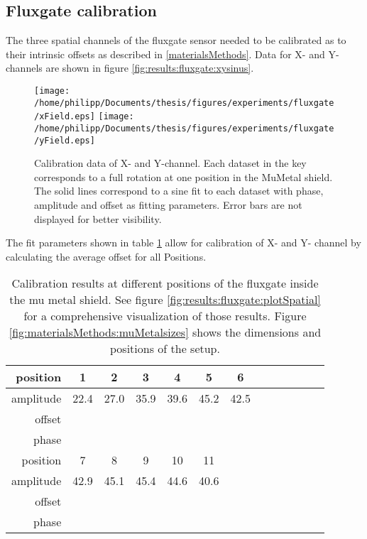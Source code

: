     \subsection{Fluxgate calibration}
        The three spatial channels of the fluxgate sensor needed to be calibrated as to their intrinsic offsets as described in \ref{materialsMethods}. Data for X- and Y-channels are shown in figure \ref{fig:results:fluxgate:xysinus}.
        \begin{figure}
            \label{fig:results:fluxgate:ysinus}
            \centering
            \texttt{[image: /home/philipp/Documents/thesis/figures/experiments/fluxgate/xField.eps]}
            \texttt{[image: /home/philipp/Documents/thesis/figures/experiments/fluxgate/yField.eps]}
            \caption[Calibration results X/Y]{Calibration data of X- and Y-channel. Each dataset in the key
            corresponds to a full rotation at one position in the MuMetal shield. The solid lines correspond to
            a sine fit to each dataset with phase, amplitude and offset as fitting parameters. Error bars are not
            displayed for better visibility.}
        \end{figure}
        The fit parameters shown in table \ref{table:results:calibrationFitParams} allow for calibration of X- and Y- channel by calculating the average offset for all Positions.
        \begin{table}
            \centering
            \label{table:results:calibrationFitParams}
            \begin{tabular}{r|cccccccccccc}
                \label{table:results:calibrationFitParams}
                position & 1& 2 & 3 & 4 & 5 & 6\\
                \hline
                amplitude & 22.4 & 27.0 & 35.9 & 39.6 & 45.2 & 42.5\\
                offset \\
                phase \\
                \hline
                position & 7 & 8 & 9 & 10 & 11 \\
                \hline
                amplitude & 42.9 & 45.1 & 45.4 & 44.6 & 40.6\\
                offset \\
                phase
            \end{tabular}
            \caption[Fluxgate calibration results]{Calibration results at different positions of the fluxgate inside the mu metal shield. See figure \ref{fig:results:fluxgate:plotSpatial} for a comprehensive visualization of those results. Figure \ref{fig:materialsMethods:muMetalsizes} shows the dimensions and positions of the setup.}
        \end{table}
